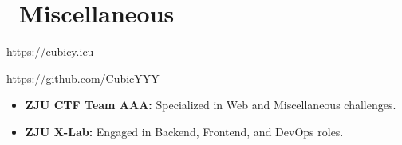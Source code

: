 \documentclass{resume}
\begin{document}
\section{\faInfo\ Miscellaneous}
\begin{description}[parsep=0.5ex]
  \item[Personal Blog] https://cubicy.icu
  \item[GitHub] https://github.com/CubicYYY
  \item[Team Involvement]
  \begin{itemize}
    \item \textbf{ZJU CTF Team AAA:} Specialized in Web and Miscellaneous challenges.
    \item \textbf{ZJU X-Lab:} Engaged in Backend, Frontend, and DevOps roles.
  \end{itemize}
\end{description}

%
%
\end{document}
